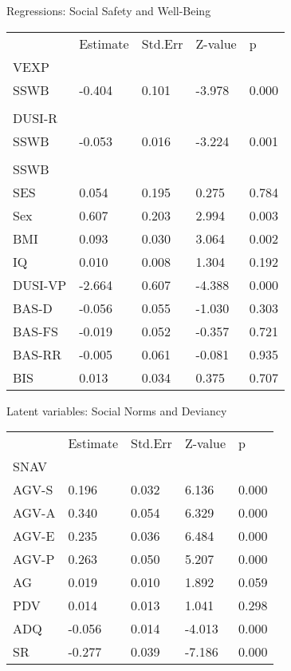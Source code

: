 \documentclass[utf8]{article}
\begin{document}
Regressions: Social Safety and Well-Being
\begin{table}[]
\begin{tabular}{lllll}
        & Estimate & Std.Err & Z-value & p     \\
VEXP    &          &         &         &       \\
SSWB    & -0.404   & 0.101   & -3.978  & 0.000 \\
        &          &         &         &       \\
DUSI-R  &          &         &         &       \\
SSWB    & -0.053   & 0.016   & -3.224  & 0.001 \\
        &          &         &         &       \\
SSWB    &          &         &         &       \\
SES     & 0.054    & 0.195   & 0.275   & 0.784 \\
Sex     & 0.607    & 0.203   & 2.994   & 0.003 \\
BMI     & 0.093    & 0.030   & 3.064   & 0.002 \\
IQ      & 0.010    & 0.008   & 1.304   & 0.192 \\
DUSI-VP & -2.664   & 0.607   & -4.388  & 0.000 \\
BAS-D   & -0.056   & 0.055   & -1.030  & 0.303 \\
BAS-FS  & -0.019   & 0.052   & -0.357  & 0.721 \\
BAS-RR  & -0.005   & 0.061   & -0.081  & 0.935 \\
BIS     & 0.013    & 0.034   & 0.375   & 0.707
\end{tabular}
\end{table}

Latent variables: Social Norms and Deviancy
\begin{table}[]
\begin{tabular}{lllll}
      & Estimate & Std.Err & Z-value & p     \\
SNAV  &          &         &         &       \\
AGV-S & 0.196    & 0.032   & 6.136   & 0.000 \\
AGV-A & 0.340    & 0.054   & 6.329   & 0.000 \\
AGV-E & 0.235    & 0.036   & 6.484   & 0.000 \\
AGV-P & 0.263    & 0.050   & 5.207   & 0.000 \\
AG    & 0.019    & 0.010   & 1.892   & 0.059 \\
PDV   & 0.014    & 0.013   & 1.041   & 0.298 \\
ADQ   & -0.056   & 0.014   & -4.013  & 0.000 \\
SR    & -0.277   & 0.039   & -7.186  & 0.000
\end{tabular}
\end{table}
\end{document}
